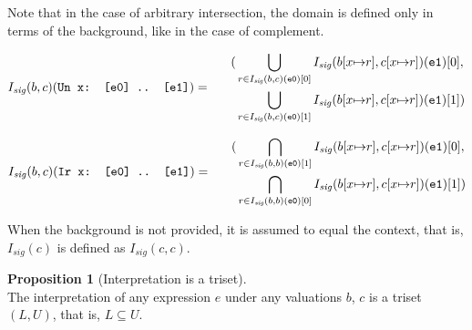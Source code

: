 \documentclass[oneside,12pt]{book}
\theoremstyle{definition}
\newtheorem{proposition}[theorem]{Proposition}
\theoremstyle{remark}
\newcommand\var[1]{\mathop{\mathit{#1}}\nolimits}
\newcommand{\sig}{\var{sig}}
\begin{document}
Note that in the case of arbitrary intersection, the domain is defined only
in terms of the background, like in the case of complement.

\begin{defBox}
  $I_{\sig}(b,c)(\texttt{Un x: [e0] .. [e1]}) = \\
    \phantom{aaa} \begin{aligned}
    (&\bigcup_{r \in I_{\sig}(b,c)(\texttt{e0})[0]}
    I_{\sig}(b[x {\mapsto} r], c[x {\mapsto} r])(\texttt{e1})[0],\\
    &\bigcup_{r \in I_{\sig}(b,c)(\texttt{e0})[1]}
    I_{\sig}(b[x {\mapsto} r], c[x {\mapsto} r])(\texttt{e1})[1])
    \end{aligned}$
  
  \bigskip \noindent $I_{\sig}(b,c)(\texttt{Ir x: [e0] .. [e1]}) = \\
    \phantom{aaa} \begin{aligned}
    (&\bigcap_{r \in I_{\sig}(b,b)(\texttt{e0})[1]}
    I_{\sig}(b[x {\mapsto} r], c[x {\mapsto} r])(\texttt{e1})[0],\\
    &\bigcap_{r \in I_{\sig}(b,b)(\texttt{e0})[0]}
    I_{\sig}(b[x {\mapsto} r], c[x {\mapsto} r])(\texttt{e1})[1])
    \end{aligned}$
  
  \bigskip \noindent When the background is not provided, it is assumed to
  equal the context, that is, $I_{\sig}(c)$ is defined as $I_{\sig}(c, c)$.
\end{defBox}

\begin{proposition}[Interpretation is a triset] \hfill \\
  The interpretation of any expression $e$ under any valuations $b$, $c$
  is a triset $(L, U)$, that is, $L \subseteq U$.
\end{proposition}
\end{document}
